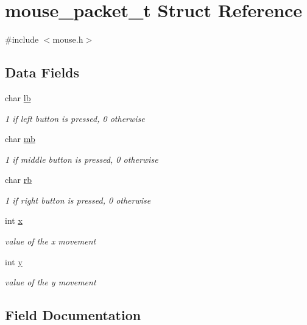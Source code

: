 \hypertarget{structmouse__packet__t}{}\section{mouse\+\_\+packet\+\_\+t Struct Reference}
\label{structmouse__packet__t}


{\ttfamily \#include $<$mouse.\+h$>$}

\subsection*{Data Fields}
\begin{DoxyCompactItemize}
\item 
char \hyperlink{structmouse__packet__t_a5c19008eeede220db3123a269f5efd21}{lb}
\begin{DoxyCompactList}\small\item\em 1 if left button is pressed, 0 otherwise \end{DoxyCompactList}\item 
char \hyperlink{structmouse__packet__t_a2923f784f55df16ef02f4db7ea172b33}{mb}
\begin{DoxyCompactList}\small\item\em 1 if middle button is pressed, 0 otherwise \end{DoxyCompactList}\item 
char \hyperlink{structmouse__packet__t_ad2b989ebf6f8d10ba3501f5c464f37e6}{rb}
\begin{DoxyCompactList}\small\item\em 1 if right button is pressed, 0 otherwise \end{DoxyCompactList}\item 
int \hyperlink{structmouse__packet__t_a6150e0515f7202e2fb518f7206ed97dc}{x}
\begin{DoxyCompactList}\small\item\em value of the x movement \end{DoxyCompactList}\item 
int \hyperlink{structmouse__packet__t_a0a2f84ed7838f07779ae24c5a9086d33}{y}
\begin{DoxyCompactList}\small\item\em value of the y movement \end{DoxyCompactList}\end{DoxyCompactItemize}


\subsection{Field Documentation}
\hypertarget{structmouse__packet__t_a5c19008eeede220db3123a269f5efd21}{}\label{structmouse__packet__t_a5c19008eeede220db3123a269f5efd21} 
